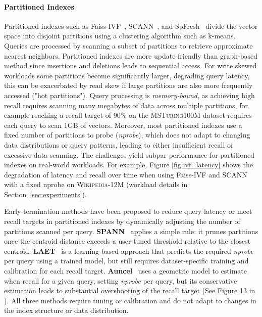 \paragraph{Partitioned Indexes}  
Partitioned indexes such as Faiss-IVF~\cite{douze2024faisslibrary}, SCANN~\cite{guo_accelerating_2020, soar_2023}, and SpFresh~\cite{xu_spfresh_2023} divide the vector space into disjoint partitions using a clustering algorithm such as k-means. Queries are processed by scanning a subset of partitions to retrieve approximate nearest neighbors. Partitioned indexes are more update-friendly than graph-based method since insertions and deletions leads to sequential access. For write skewed workloads some partitions become significantly larger, degrading query latency, this can be exacerbated by read skew if large partitions are also more frequently accessed ("hot partitions"). Query processing is \emph{memory-bound}, as achieving high recall requires scanning many megabytes of data across multiple partitions, for example reaching a recall target of 90\% on the \textsc{MSTuring100M} dataset requires each query to scan 1GB of vectors. Moreover, most partitioned indexes use a fixed number of partitions to probe (\emph{nprobe}), which does not adapt to changing data distributions or query patterns, leading to either insufficient recall or excessive data scanning. The challenges yield subpar performance for partitioned indexes on real-world workloads. For example, Figure \ref{fig:ivf_latency} shows the degradation of latency and recall over time when using Faiss-IVF and SCANN with a fixed nprobe on \textsc{Wikipedia-12M} (workload details in Section~\ref{sec:experiments}).

Early-termination methods have been proposed to reduce query latency or meet recall targets in partitioned indexes by dynamically adjusting the number of partitions scanned per query. \textbf{SPANN}~\cite{chen_spann_nodate} applies a simple rule: it prunes partitions once the centroid distance exceeds a user-tuned threshold relative to the closest centroid. \textbf{LAET}~\cite{li2020improving} is a learning-based approach that predicts the required \emph{nprobe} per query using a trained model, but still requires dataset-specific training and calibration for each recall target. \textbf{Auncel}~\cite{zhang2023fast} uses a geometric model to estimate when recall for a given query, setting \emph{nprobe} per query, but its conservative estimation leads to substantial overshooting of the recall target (See Figure 13 in \cite{zhang2023fast}). All three methods require tuning or calibration and do not adapt to changes in the index structure or data distribution.

